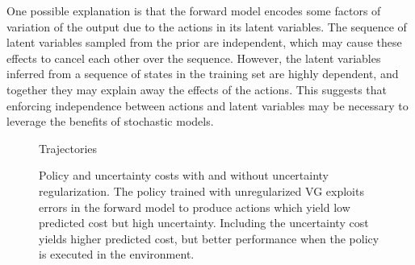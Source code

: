 \documentclass{article} %
\begin{document}
One possible explanation is that the forward model encodes some factors of variation of the output due to the actions in its latent variables.
The sequence of latent variables sampled from the prior are independent, which may cause these effects to cancel each other over the sequence. However, the latent variables inferred from a sequence of states in the training set are highly dependent, and together they may explain away the effects of the actions.
This suggests that enforcing independence between actions and latent variables may be necessary to leverage the benefits of stochastic models.





\begin{figure}[t!]
    \centering
    \caption{Trajectories}
    \label{trajectories}
\end{figure}




\begin{figure}[t!]
    \centering
    \caption{Policy and uncertainty costs with and without uncertainty regularization. The policy trained with unregularized VG exploits errors in the forward model to produce actions which yield low predicted cost but high uncertainty. Including the uncertainty cost yields higher predicted cost, but better performance when the policy is executed in the environment.}
    \label{svg-pred}
\end{figure}
\end{document}
